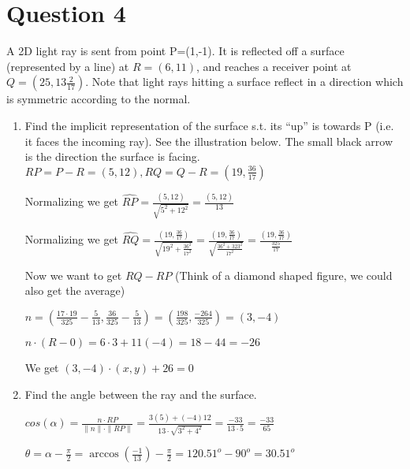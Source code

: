 \documentclass{article}
\begin{document}
    \section*{Question 4}
    A 2D light ray is sent from point P=(1,-1). It is reflected off a surface (represented by a line) at $R=(6,11)$, and reaches a receiver point at $Q=(25,13\frac{2}{17})$.
     Note that light rays hitting a surface reflect in a direction which is symmetric according to the normal.
    \begin{enumerate}
        \item Find the implicit representation of the surface s.t. its “up” is towards P (i.e. it faces the incoming ray). See the illustration below. The small black arrow is the direction the surface is facing.
        $RP = P - R = (5, 12), RQ = Q - R = (19, \frac{36}{17})$
        
        Normalizing we get $\hat{RP} = \frac{(5,12)}{\sqrt{5^2 + 12^2}} = \frac{(5,12)}{13}$

        Normalizing we get $\hat{RQ} = \frac{(19, \frac{36}{17})}{\sqrt{19^2 + \frac{36^2}{17^2}}} = \frac{(19, \frac{36}{17})}{\sqrt{\frac{36^2 + 323^2}{17^2}}} = \frac{(19, \frac{36}{17})}{\frac{325}{17}}$

        Now we want to get  $RQ - RP$ (Think of a diamond shaped figure, we could also get the average) 

        $n = (\frac{ 17 \cdot 19}{325} - \frac{5}{13},\frac{36}{325}  - \frac{5}{13}) = (\frac{198}{325} , \frac{-264}{325}) =  (3 , -4)$

        $n \cdot (R - 0) = 6 \cdot 3 + 11 (-4) = 18 - 44 = -26$

        We get $(3, -4) \cdot (x, y) + 26 = 0$

        \item Find the angle between the ray and the surface.
        
        $ cos(\alpha) = \frac{n \cdot RP }{ \| n \| \cdot \|RP \|} = \frac{ 3(5) + (-4)12 }{13 \cdot \sqrt{3^2 + 4^2}} = \frac{-33}{13 \cdot 5} =\frac{-33}{65}  $

        $\theta =   \alpha - \frac{\pi}{2} =  \arccos(\frac{-1}{13}) - \frac{\pi}{2} = 120.51^o - 90^o = 30.51^o$
    \end{enumerate}
\end{document}

